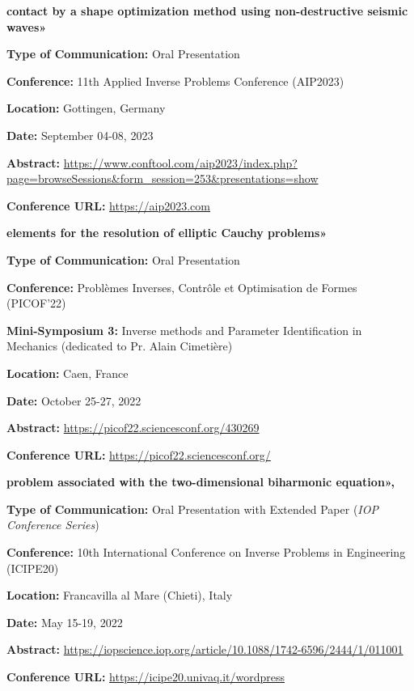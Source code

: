 \documentclass[10pt]{article} %
\begin{document}
{\vspace{-0.13cm}\textbf{contact by a shape optimization method using non-destructive seismic waves»}
	
	\textbf{Type of Communication:} Oral Presentation
	
	\textbf{Conference:} 11th Applied Inverse Problems Conference (AIP2023)
	
	\textbf{Location:} Gottingen, Germany
	
	\textbf{Date:} September 04-08, 2023
	
	\textbf{Abstract:} \href{https://www.conftool.com/aip2023/index.php?page=browseSessions\&form\_session=253\&presentations=show}{https://www.conftool.com/aip2023/index.php?page=browseSessions\&form\_session=253\&presentations=show}
	
	\textbf{Conference URL:} \href{https://aip2023.com}{https://aip2023.com}
}
\newpage
{\vspace{-0.13cm}\textbf{elements for the resolution of  elliptic Cauchy problems»}
	
\textbf{Type of Communication:} Oral Presentation

\textbf{Conference:} Problèmes Inverses, Contrôle et Optimisation de Formes (PICOF'22)

\textbf{Mini-Symposium 3:} Inverse methods and Parameter Identification in Mechanics (dedicated to Pr. Alain Cimetière)


\textbf{Location:} Caen, France

\textbf{Date:} October 25-27, 2022

\textbf{Abstract:} \href{https://picof22.sciencesconf.org/430269}{https://picof22.sciencesconf.org/430269}

\textbf{Conference URL:} \href{https://picof22.sciencesconf.org/}{https://picof22.sciencesconf.org/}
}
{\vspace{-0.13cm}\textbf{problem associated with the two-dimensional biharmonic equation»,}

\textbf{Type of Communication:} Oral Presentation with Extended Paper (\textit{IOP Conference Series})

\textbf{Conference:} 10th International Conference on Inverse Problems in Engineering (ICIPE20)

\textbf{Location:} Francavilla al Mare (Chieti), Italy

\textbf{Date:} May 15-19, 2022

\textbf{Abstract:} \href{https://iopscience.iop.org/article/10.1088/1742-6596/2444/1/011001}{https://iopscience.iop.org/article/10.1088/1742-6596/2444/1/011001}


\textbf{Conference URL:} \href{https://icipe20.univaq.it/wordpress/}{https://icipe20.univaq.it/wordpress}
}
\end{document}
